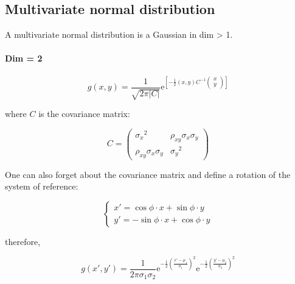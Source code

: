 \subsection{Multivariate normal distribution}
\label{subsec:multivariate_normal_distr}

A multivariate normal distribution is a Gaussian in dim > 1.

\paragraph{Dim = 2}

\begin{equation}\label{eq:bivariate_normal_joint_density}
	g(x, y) = \frac{1}{\sqrt{2 \pi {\left| C \right|}}} \mathrm{e}^{\left[ - \frac{1}{2} (x, y) C^{-1} 
	\left( \begin{array}{c}
		x \\
		y 
	\end{array} \right) \right]}
\end{equation}

where $C$ is the covariance matrix: 

\begin{equation}\label{eq:covariance_matrix}
	C = 
	\left( \begin{array}{cc}
		{\sigma_{x}}^{2} & \rho_{xy} \sigma_{x} \sigma_{y} \\
		\rho_{xy} \sigma_{x} \sigma_{y} & {\sigma_{y}}^{2}
	\end{array} \right)
\end{equation}

One can also forget about the covariance matrix and define a rotation of the system of reference: 

\begin{equation}\label{eq:rotation_of_system_of_reference}
	\left\{
	\begin{array}{l}
		x' = \cos \phi \cdot x + \sin \phi \cdot y\\
		y' = - \sin \phi \cdot x + \cos \phi \cdot y
	\end{array} \right.
\end{equation}

therefore, 

\begin{equation}
	g(x', y') = \frac{1}{2 \pi \sigma_{1} \sigma_{2}} 
	\mathrm{e}^{- \frac{1}{2} {\left( \frac{x' - \mu_{1}}{\sigma_{1}} \right)}^{2}} 
	\mathrm{e}^{- \frac{1}{2} {\left( \frac{y' - \mu_{2}}{\sigma_{2}} \right)}^{2}}
\end{equation}


